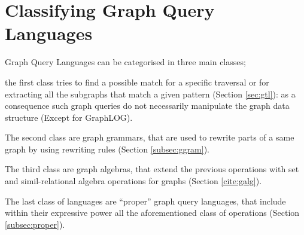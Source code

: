 \section{Classifying Graph Query Languages}\label{sec:dbqlang}

%

Graph Query Languages can be categorised in three main classes;
\begin{alphalist}
	\item the first class  tries to find a
	possible match for a specific traversal  or for extracting all the subgraphs that match a given pattern (Section \vref{sec:gtl}): as a consequence such graph
	queries do not necessarily manipulate the graph data structure (Except for GraphLOG).
	\item The second class are graph grammars, that are used to rewrite parts of a same graph by using rewriting rules (Section \vref{subsec:ggram}).
	\item The third class are graph algebras, that extend the previous operations with set and simil-relational algebra operations for graphs (Section \vref{cite:galg}).
	\item The last class of languages are ``proper'' graph query languages, that include within their expressive power all the aforementioned class of operations (Section \vref{subsec:proper}).
\end{alphalist}

